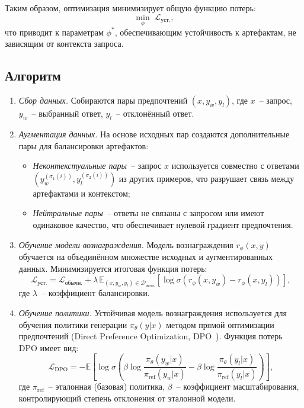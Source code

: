 Таким образом, оптимизация минимизирует общую функцию потерь:
\begin{equation}
\min_{\phi} \; \mathcal{L}_{\text{уст.}},
\end{equation}
что приводит к параметрам $\phi^\ast$, обеспечивающим устойчивость к артефактам, не зависящим от контекста запроса.

\subsection{Алгоритм}

\begin{enumerate}
  \item \emph{Сбор данных.}  
  Собираются пары предпочтений $(x, y_w, y_l)$, где $x$~-- запрос, $y_w$~-- выбранный ответ, $y_l$~-- отклонённый ответ.  

  \item \emph{Аугментация данных.}  
  На основе исходных пар создаются дополнительные пары для балансировки артефактов:
  \begin{itemize}
    \item \emph{Неконтекстуальные пары}~-- запрос $x$ используется совместно с ответами $(y^{(\sigma_1(i))}_w, y^{(\sigma_2(i))}_l)$ из других примеров, что разрушает связь между артефактами и контекстом;
    \item \emph{Нейтральные пары}~-- ответы не связаны с запросом или имеют одинаковое качество, что обеспечивает нулевой градиент предпочтения.
  \end{itemize}

  \item \emph{Обучение модели вознаграждения.}  
  Модель вознаграждения $r_\phi(x, y)$ обучается на объединённом множестве исходных и аугментированных данных.  
  Минимизируется итоговая функция потерь:
  \begin{equation}
  \mathcal{L}_{\text{уст.}} = 
  \mathcal{L}_{\text{обычн.}} 
  + \lambda \, 
  \mathbb{E}_{(x, y_w, y_l) \in \mathcal{D}_{\text{аугм.}}}
  \left[ 
  \log \sigma(r_\phi(x, y_w) - r_\phi(x, y_l))
  \right],
  \end{equation}
  где $\lambda$~-- коэффициент балансировки.

  \item \emph{Обучение политики.}  
  Устойчивая модель вознаграждения используется для обучения политики генерации $\pi_\theta(y|x)$ методом прямой оптимизации предпочтений (Direct Preference Optimization, DPO~\cite{rafailov2024direct}).  
  Функция потерь DPO имеет вид:
  \begin{equation}
  \mathcal{L}_{\text{DPO}} =
  -\mathbb{E} \left[
  \log \sigma \left(
  \beta 
  \log \frac{\pi_\theta(y_w|x)}{\pi_{\text{ref}}(y_w|x)}
  - 
  \beta 
  \log \frac{\pi_\theta(y_l|x)}{\pi_{\text{ref}}(y_l|x)}
  \right)
  \right],
  \end{equation}
  где $\pi_{\text{ref}}$~-- эталонная (базовая) политика, $\beta$~-- коэффициент масштабирования, контролирующий степень отклонения от эталонной модели.


\end{enumerate}
